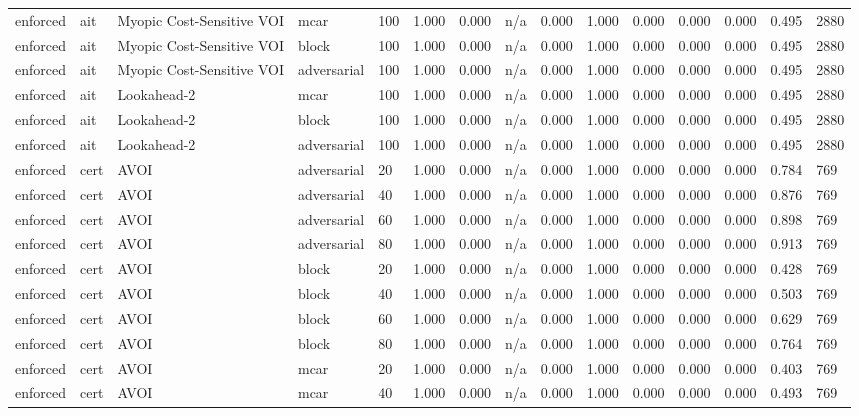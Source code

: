 \begin{table}[!ht]
{\begin{tabular}{lllllllllllllll}
enforced & ait & Myopic Cost-Sensitive VOI & mcar & 100 & 1.000 & 0.000 & n/a & 0.000 & 1.000 & 0.000 & 0.000 & 0.000 & 0.495 & 2880 \\
enforced & ait & Myopic Cost-Sensitive VOI & block & 100 & 1.000 & 0.000 & n/a & 0.000 & 1.000 & 0.000 & 0.000 & 0.000 & 0.495 & 2880 \\
enforced & ait & Myopic Cost-Sensitive VOI & adversarial & 100 & 1.000 & 0.000 & n/a & 0.000 & 1.000 & 0.000 & 0.000 & 0.000 & 0.495 & 2880 \\
enforced & ait & Lookahead-2 & mcar & 100 & 1.000 & 0.000 & n/a & 0.000 & 1.000 & 0.000 & 0.000 & 0.000 & 0.495 & 2880 \\
enforced & ait & Lookahead-2 & block & 100 & 1.000 & 0.000 & n/a & 0.000 & 1.000 & 0.000 & 0.000 & 0.000 & 0.495 & 2880 \\
enforced & ait & Lookahead-2 & adversarial & 100 & 1.000 & 0.000 & n/a & 0.000 & 1.000 & 0.000 & 0.000 & 0.000 & 0.495 & 2880 \\
enforced & cert & AVOI & adversarial & 20 & 1.000 & 0.000 & n/a & 0.000 & 1.000 & 0.000 & 0.000 & 0.000 & 0.784 & 769 \\
enforced & cert & AVOI & adversarial & 40 & 1.000 & 0.000 & n/a & 0.000 & 1.000 & 0.000 & 0.000 & 0.000 & 0.876 & 769 \\
enforced & cert & AVOI & adversarial & 60 & 1.000 & 0.000 & n/a & 0.000 & 1.000 & 0.000 & 0.000 & 0.000 & 0.898 & 769 \\
enforced & cert & AVOI & adversarial & 80 & 1.000 & 0.000 & n/a & 0.000 & 1.000 & 0.000 & 0.000 & 0.000 & 0.913 & 769 \\
enforced & cert & AVOI & block & 20 & 1.000 & 0.000 & n/a & 0.000 & 1.000 & 0.000 & 0.000 & 0.000 & 0.428 & 769 \\
enforced & cert & AVOI & block & 40 & 1.000 & 0.000 & n/a & 0.000 & 1.000 & 0.000 & 0.000 & 0.000 & 0.503 & 769 \\
enforced & cert & AVOI & block & 60 & 1.000 & 0.000 & n/a & 0.000 & 1.000 & 0.000 & 0.000 & 0.000 & 0.629 & 769 \\
enforced & cert & AVOI & block & 80 & 1.000 & 0.000 & n/a & 0.000 & 1.000 & 0.000 & 0.000 & 0.000 & 0.764 & 769 \\
enforced & cert & AVOI & mcar & 20 & 1.000 & 0.000 & n/a & 0.000 & 1.000 & 0.000 & 0.000 & 0.000 & 0.403 & 769 \\
enforced & cert & AVOI & mcar & 40 & 1.000 & 0.000 & n/a & 0.000 & 1.000 & 0.000 & 0.000 & 0.000 & 0.493 & 769 \\

\end{tabular}}
\end{table}
